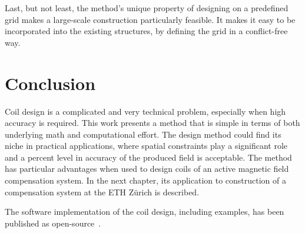 Last, but not least, the method's unique property of designing on a predefined grid makes a large-scale construction particularly feasible. It makes it easy to be incorporated into the existing structures, by defining the grid in a conflict-free way.




\section{Conclusion}
Coil design is a complicated and very technical problem, especially when high accuracy is required. This work presents a method that is simple in terms of both underlying math and computational effort. The design method could find its niche in practical applications, where spatial constraints play a significant role and a percent level in accuracy of the produced field is acceptable. The method has particular advantages when used to design coils of an active magnetic field compensation system. In the next chapter, its application to construction of a compensation system at the ETH Zürich is described.

The software implementation of the coil design, including examples, has been published as open-source~\cite{Coilsjlcode}.
